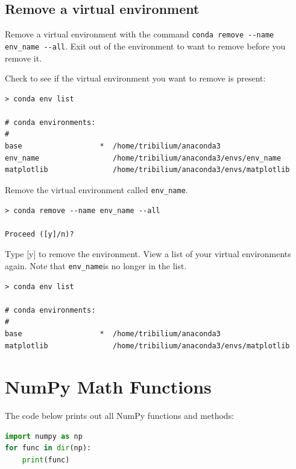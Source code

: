 \documentclass{book}
\begin{document}
    
        \subsection{Remove a virtual
environment}\label{remove-a-virtual-environment}

Remove a virtual environment with the command
\lstinline!conda remove --name env_name --all!. Exit out of the
environment to want to remove before you remove it.

Check to see if the virtual environment you want to remove is present:

\begin{lstlisting}
> conda env list

# conda environments:
#
base                  *  /home/tribilium/anaconda3
env_name                 /home/tribilium/anaconda3/envs/env_name
matplotlib               /home/tribilium/anaconda3/envs/matplotlib
\end{lstlisting}

Remove the virtual environment called \lstinline!env_name!.

\begin{lstlisting}
> conda remove --name env_name --all

Proceed ([y]/n)?
\end{lstlisting}

Type {[}y{]} to remove the environment. View a list of your virtual
environments again. Note that \lstinline!env_name!is no longer in the
list.

\begin{lstlisting}
> conda env list

# conda environments:
#
base                  *  /home/tribilium/anaconda3
matplotlib               /home/tribilium/anaconda3/envs/matplotlib
\end{lstlisting}
    




    
        \section{NumPy Math Functions}\label{numpy-math-functions}
    




    
        The code below prints out all NumPy functions and methods:

\begin{lstlisting}[language=Python]
import numpy as np
for func in dir(np):
    print(func)
\end{lstlisting}
    
\end{document}
